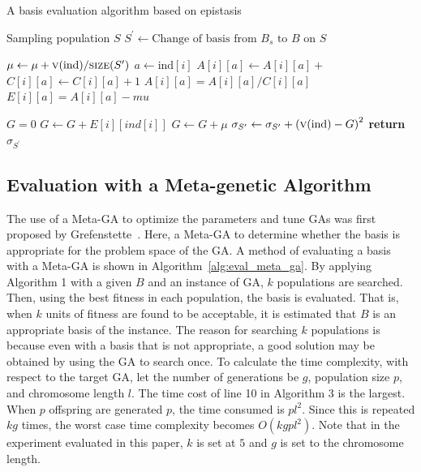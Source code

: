 \begin{algorithm}[H]
	\caption{A basis evaluation algorithm based on epistasis} \label{alg:eval_epi}
	\begin{algorithmic}[1]
		\Require Sampling population $S$
		 
		\State $S^{\prime} \gets \text{Change of basis from } B_s \text{ to } B \text{ on } S $ 
		\State
		
		\State $\mu \gets \mu + \text{\Call{v}{ind}/\Call{size}{$S^\prime$}}$
		\State $ a \gets \text{ind}[i]$ 
		\State $A[i][a] \gets A[i][a] +$ 
		\State $C[i][a] \gets C[i][a] + 1$ 
		\EndFor
		\EndFor
		\State
		\State $A[i][a] = A[i][a] / C[i][a]$
		\State $E[i][a] = A[i][a] -mu$
		\EndFor
		\EndFor
		\State
		
		\State $G = 0$ 
		\State $G \gets G + E[i][ind[i]]$
		\EndFor
		\State $G \gets G + \mu$
		\State $\sigma_{S^\prime} \gets \sigma_{S^\prime} + \left(\text{\Call{v}{ind}}-G\right)^2$ 
		\EndFor
		\State \textbf{return} $\sigma_{S^\prime}$
		\EndProcedure
	\end{algorithmic}
\end{algorithm}


\subsection{Evaluation with a Meta-genetic Algorithm}
The use of a Meta-GA to optimize the parameters and tune GAs was first proposed by Grefenstette~\cite{Grefenstette:1986:OCP:14111.14123}. Here, a Meta-GA to determine whether the basis is appropriate for the problem space of the GA. A method of evaluating a basis with a Meta-GA is shown in Algorithm~\ref{alg:eval_meta_ga}. By applying Algorithm 1 with a given $ B $ and an instance of GA, $ k $ populations are searched. Then, using the best fitness in each population, the basis is evaluated. That is, when $ k $ units of fitness are found to be acceptable, it is estimated that $ B $ is an appropriate basis of the instance. The reason for searching $ k $ populations is because even with a basis that is not appropriate, a good solution may be obtained by using the GA to search once. To calculate the time complexity, with respect to the target GA, let the number of generations be $ g $, population size $ p $, and chromosome length $ l $. The time cost of line 10 in Algorithm 3 is the largest. When $ p $ offspring are generated $ p $, the time consumed is $ pl^2 $. Since this is repeated $ kg $ times, the worst case time complexity becomes $ O(kgpl^2) $. Note that in the experiment evaluated in this paper, $ k $ is set at $ 5 $ and $ g $ is set to the chromosome length.

